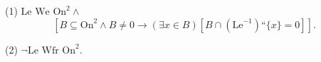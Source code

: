 (1) $\text{Le We On}^2 \wedge$
$$[B \subseteq \text{On}^2 \wedge B \neq 0 \rightarrow (\exists x \in B)[B \cap (\text{Le}^{-1})“\{x\} = 0]].$$

(2) $\neg \text{Le Wfr On}^2$.
